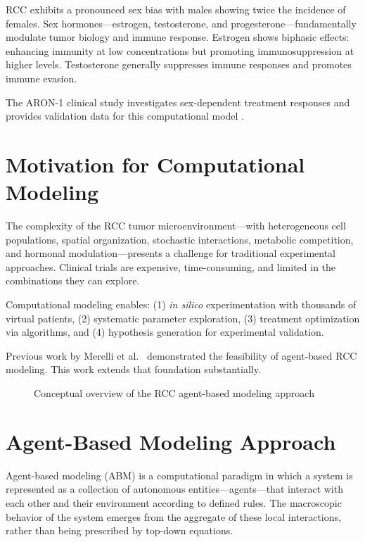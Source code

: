 RCC exhibits a pronounced sex bias with males showing twice the incidence of females. Sex hormones---estrogen, testosterone, and progesterone---fundamentally modulate tumor biology and immune response. Estrogen shows biphasic effects: enhancing immunity at low concentrations but promoting immunosuppression at higher levels. Testosterone generally suppresses immune responses and promotes immune evasion.

The ARON-1 clinical study investigates sex-dependent treatment responses and provides validation data for this computational model \cite{santoni2024}.

\section{Motivation for Computational Modeling}
\label{sec:intro_motivation}

The complexity of the RCC tumor microenvironment---with heterogeneous cell populations, spatial organization, stochastic interactions, metabolic competition, and hormonal modulation---presents a challenge for traditional experimental approaches. Clinical trials are expensive, time-consuming, and limited in the combinations they can explore.

Computational modeling enables: (1) \emph{in silico} experimentation with thousands of virtual patients, (2) systematic parameter exploration, (3) treatment optimization via algorithms, and (4) hypothesis generation for experimental validation.

Previous work by Merelli et al.\ \cite{merelli2021} demonstrated the feasibility of agent-based RCC modeling. This work extends that foundation substantially.

\begin{figure}[htbp]
\centering
{}
\caption{Conceptual overview of the RCC agent-based modeling approach}
\label{fig:conceptual_overview}
\end{figure}

\section{Agent-Based Modeling Approach}
\label{sec:intro_abm}

Agent-based modeling (ABM) is a computational paradigm in which a system is represented as a collection of autonomous entities---agents---that interact with each other and their environment according to defined rules. The macroscopic behavior of the system emerges from the aggregate of these local interactions, rather than being prescribed by top-down equations.

